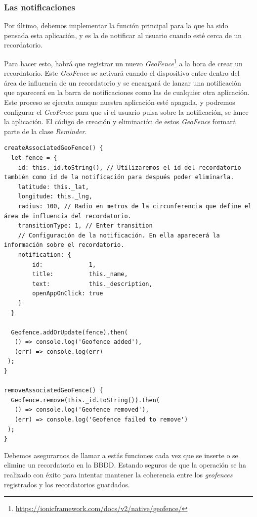 \subsubsection{Las notificaciones}

Por último, debemos implementar la función principal para la que ha sido pensada esta aplicación, y es la de notificar al usuario cuando esté cerca de un recordatorio.

Para hacer esto, habrá que registrar un nuevo \emph{GeoFence}\footnote{\url{https://ionicframework.com/docs/v2/native/geofence/}} a la hora de crear un recordatorio. Este \emph{GeoFence} se activará cuando el dispositivo entre dentro del área de influencia de un recordatorio y se encargará de lanzar una notificación que aparecerá en la barra de notificaciones como las de cualquier otra aplicación. Este proceso se ejecuta aunque nuestra aplicación esté apagada, y podremos configurar el \emph{GeoFence} para que si el usuario pulsa sobre la notificación, se lance la aplicación. El código de creación y eliminación de estos \emph{GeoFence} formará parte de la clase \emph{Reminder}.

\begin{lstlisting}[style=htmlcssjs,frame=tlrb,xleftmargin={0.2cm}]
  createAssociatedGeoFence() {
  let fence = {
    id: this._id.toString(), // Utilizaremos el id del recordatorio también como id de la notificación para después poder eliminarla.
    latitude: this._lat,
    longitude: this._lng,
    radius: 100, // Radio en metros de la circunferencia que define el área de influencia del recordatorio.
    transitionType: 1, // Enter transition
    // Configuración de la notificación. En ella aparecerá la información sobre el recordatorio.
    notification: {
        id:             1,
        title:          this._name,
        text:           this._description,
        openAppOnClick: true
    }
  }

  Geofence.addOrUpdate(fence).then(
   () => console.log('Geofence added'),
   (err) => console.log(err)
 );
}

removeAssociatedGeoFence() {
  Geofence.remove(this._id.toString()).then(
   () => console.log('Geofence removed'),
   (err) => console.log('Geofence failed to remove')
 );
}
\end{lstlisting}

Debemos asegurarnos de llamar a estás funciones cada vez que se inserte o se elimine un recordatorio en la \gls{BBDD}. Estando seguros de que la operación se ha realizado con éxito para intentar mantener la coherencia entre los \emph{geofences} registrados y los recordatorios guardados.
